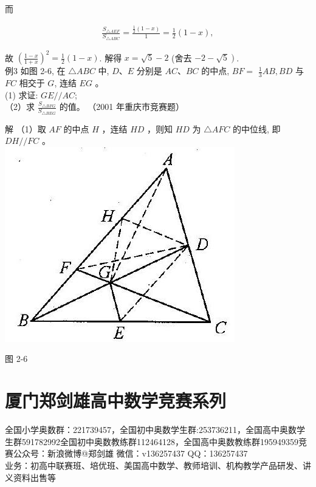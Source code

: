\documentclass[10pt]{article}
\begin{document}
而

\begin{align*}
\frac{S_{\triangle A E F}}{S_{\triangle A B C}}=\frac{\frac{1}{2}(1-x)}{1}=\frac{1}{2}(1-x),
\end{align*}

故 $\left(\frac{1-x}{1+x}\right)^{2}=\frac{1}{2}(1-x)$. 解得 $x=\sqrt{5}-2$ (舍去 $\left.-2-\sqrt{5}\right)$.\\
例3 如图 2-6, 在 $\triangle A B C$ 中, $D 、 E$ 分别是 $A C 、 B C$ 的中点, $B F=$ $\frac{1}{3} A B, B D$ 与 $F C$ 相交于 $G$, 连结 $E G$ 。\\
(1) 求证: $G E / / A C$;\\
（2）求 $\frac{S_{\triangle B F G}}{S_{\triangle B E G}}$ 的值。 （2001 年重庆市竞赛题）

解 （1）取 $A F$ 的中点 $H$ ，连结 $H D$ ，则知 $H D$ 为 $\triangle A F C$ 的中位线, 即 $D H / / F C$ 。\\
\includegraphics[max width=\textwidth, center]{2024_10_30_2c8f45efd4a519b08e1ag-018}

图 2-6

\section*{厦门郑剑雄高中数学竞赛系列}
全国小学奥数群：221739457，全国初中奥数学生群:253736211，全国高中奥数学生群591782992全国初中奥数教练群112464128，全国高中奥数教练群195949359竞赛公众号：新浪微博@郑剑雄 微信：v136257437 QQ：136257437\\
业务：初高中联赛班、培优班、美国高中数学、教师培训、机构教学产品研发、讲义资料出售等
\end{document}
